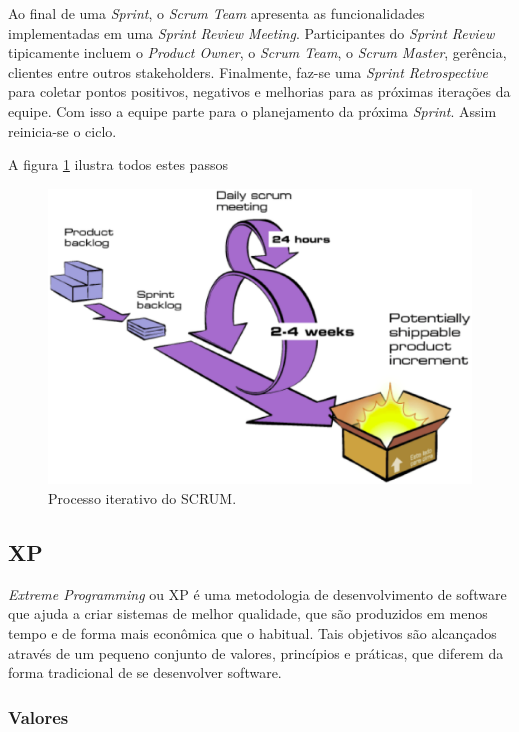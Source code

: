 Ao final de uma \textit{Sprint}, o \textit{Scrum Team} apresenta as funcionalidades implementadas em uma \textit{Sprint Review Meeting}.  Participantes do \textit{Sprint Review} tipicamente incluem o \textit{Product Owner}, o \textit{Scrum Team}, o \textit{Scrum Master}, gerência, clientes entre outros stakeholders. Finalmente, faz-se uma \textit{Sprint Retrospective} para coletar pontos positivos, negativos e melhorias para as próximas iterações da equipe. Com isso a equipe parte para o planejamento da próxima \textit{Sprint}. Assim reinicia-se o ciclo. \cite{scrum}

A figura \ref{fig:scrum} ilustra todos estes passos

\begin{figure}[h!]
	\centering
  \includegraphics[keepaspectratio=true,scale=0.5]{figuras/scrum.eps}
  \caption{Processo iterativo do SCRUM. \cite{scrum}}
	\label{fig:scrum}
\end{figure}

\subsection{XP}

\textit{Extreme Programming} ou XP é uma metodologia de desenvolvimento de software que ajuda a criar sistemas de melhor qualidade, que são produzidos em menos tempo e de forma mais econômica que o habitual. Tais objetivos são alcançados através de um pequeno conjunto de valores, princípios e práticas, que diferem da forma tradicional de se desenvolver software. \cite{xp}

\subsubsection{Valores}

